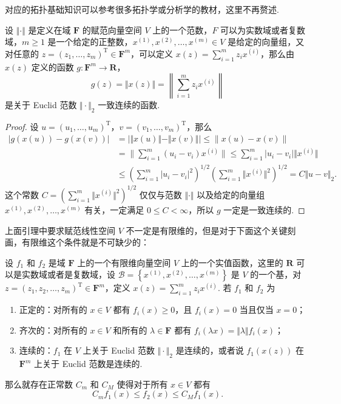对应的拓扑基础知识可以参考很多拓扑学或分析学的教材，这里不再赘述.

\begin{lemma}{}{}
    设 $\Vert \cdot\Vert$ 是定义在域 $\mathbf{F}$ 的赋范向量空间 $V$ 上的一个范数，$F$ 可以为实数域或者复数域，$m\geqslant 1$ 是一个给定的正整数，$x^{(1)}, x^{(2)}, \ldots, x^{(m)}\in V$ 是给定的向量组，又对任意的 $z = (z_1, \ldots, z_m)^\mathrm{T} \in \mathbf{F}^m$，可以定义 $x(z) = \sum\limits_{i=1}^{m}z_ix^{(i)}$，那么由 $x(z)$ 定义的函数 $g\colon \mathbf{F}^m\to \mathbf{R}$，
    \[g(z) = \Vert x(z)\Vert = \left\lVert \sum_{i=1}^{m}z_ix^{(i)}\right\rVert\] 是关于 Euclid 范数 $\Vert\cdot\Vert_2$ 一致连续的函数.
\end{lemma}

\begin{proof}
    设 $u = (u_1, \ldots, u_m)^\mathrm{T}$，$v = (v_1, \ldots, v_m)^\mathrm{T}$，那么
    \[\begin{aligned}
            \vert g(x(u)) - g(x(v))\vert
             & = \lvert \Vert x(u) \Vert - \Vert x(v) \Vert \rvert \leqslant \lVert x(u) - x(v)\rVert                                                           \\
             & = \lVert \sum_{i = 1}^{m} (u_i - v_i)x^{(i)}\rVert \leqslant \sum_{i = 1}^{m}\vert u_i - v_i\vert \Vert x^{(i)}\Vert                             \\
             & \leqslant \left(\sum_{i = 1}^{m}\vert u_i - v_i\vert^2\right)^{1/2}\left(\sum_{i = 1}^{m}\Vert x^{(i)}\Vert^2\right)^{1/2} =C\Vert u - v\Vert_2.
        \end{aligned}\]
    这个常数 $C = \left(\sum\limits_{i = 1}^{m}\Vert x^{(i)}\Vert^2\right)^{1/2}$ 仅仅与范数 $\Vert\cdot\Vert$ 以及给定的向量组 $x^{(1)}, x^{(2)}, \ldots, x^{(m)}$ 有关，一定满足 $0 \leqslant C<\infty$，所以 $g$ 一定是一致连续的.
\end{proof}

上面引理中要求赋范线性空间 $V$ 不一定是有限维的，但是对于下面这个关键刻画，有限维这个条件就是不可缺少的：

\begin{theorem}{}{}
    设 $f_1$ 和 $f_2$ 是域 $\mathbf{F}$ 上的一个有限维向量空间 $V$ 上的一个实值函数，这里的 $\mathbf{R}$ 可以是实数域或者是复数域，设 $\mathcal{B} = \left\{x^{(1)}, x^{(2)}, \ldots, x^{(m)}\right\}$ 是 $V$ 的一个基，对 $z = (z_1, z_2, \ldots, z_m)^\mathrm{T}\in \mathbf{F}^m$，定义 $x(z) = \sum\limits_{i=1}^{m}z_ix^{(i)}$. 若 $f_1$ 和 $f_2$ 为
    \begin{enumerate}
        \item 正定的：对所有的 $x\in V$ 都有 $f_i(x)\geqslant 0$，且 $f_i(x) = 0$ 当且仅当 $x = 0$；
        \item 齐次的：对所有的 $x\in V$ 和所有的 $\lambda\in\mathbf{F}$ 都有 $f_i(\lambda x) = \Vert \lambda\Vert f_i(x)$；
        \item 连续的：$f_1$ 在 $V$ 上关于 Euclid 范数 $\Vert\cdot\Vert_2$ 是连续的，或者说 $f_1(x(z))$ 在 $\mathbf{F}^m$ 上关于 Euclid 范数是连续的.
    \end{enumerate}
    那么就存在正常数 $C_m$ 和 $C_M$ 使得对于所有 $x\in V$ 都有 \[C_mf_1(x) \leqslant f_2(x) \leqslant C_Mf_1(x).\]
\end{theorem}

